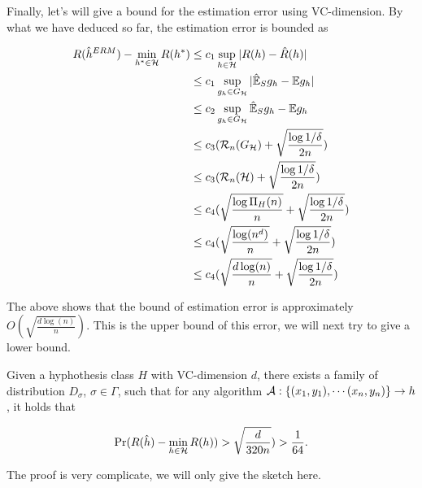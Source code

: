 \documentclass[../main.tex]{subfiles}
\begin{document}
		 Finally, let's will give a bound for the estimation error using VC-dimension. By what we have deduced so far, the estimation error is bounded as
		 
		 \begin{equation*}
		 	\begin{aligned}
		 		R(\hat{h}^{ERM}) - \min\limits_{h^*\in \mathcal{H}} R(h^*) & \leq c_1 \sup\limits_{h\in \mathcal{H}} |R(h) - \hat{R}(h)| \\
		 		& \leq c_1 \sup\limits_{g_h \in G_{\mathcal{H}}} |\hat{\mathbb{E}}_S g_h - \mathbb{E} g_h| \\
		 		& \leq c_2 \sup\limits_{g_h \in G_{\mathcal{H}}} \hat{\mathbb{E}}_S g_h - \mathbb{E} g_h \\
		 		& \leq c_3 (\mathcal{R}_n(G_{\mathcal{H}}) + \sqrt{\frac{\log 1 / \delta}{2n}}) \\
			 	& \leq c_3 (\mathcal{R}_n(\mathcal{H}) + \sqrt{\frac{\log 1 / \delta}{2n}}) \\
			 	& \leq c_4 (\sqrt{\frac{\log \Pi_{H}(n)}{n}} + \sqrt{\frac{\log 1 / \delta}{2n}}) \\
			 	& \leq c_4 (\sqrt{\frac{\log(n^d)}{n}} + \sqrt{\frac{\log 1 / \delta}{2n}}) \\
			 	& \leq c_4 (\sqrt{\frac{d\log(n)}{n}} + \sqrt{\frac{\log 1 / \delta}{2n}}) \\
		 	\end{aligned}
		 \end{equation*}
		 
		 The above shows that the bound of estimation error is approximately $O(\sqrt{\frac{d\log (n)}{n}})$. This is the upper bound of this error, we will next try to give a lower bound.
		 
		 \begin{claim}
		 	Given a hyphothesis class $H$ with VC-dimension $d$, there exists a family of distribution $D_{\sigma}$, $\sigma \in \Gamma$, such that for any algorithm $\mathcal{A}: \{(x_1, y_1), \cdots (x_n,y_n)\} \to h$, it holds that
		 	
		 	\begin{equation}
		 		\Pr(R(\hat{h}) - \min\limits_{h\in \mathcal{H}} R(h)) > \sqrt{\frac{d}{320n}} ) > \frac{1}{64}.
		 	\end{equation}
		 \end{claim}
		 
		 The proof is very complicate, we will only give the sketch here.
		 
\end{document}
